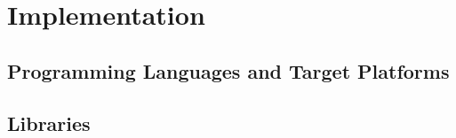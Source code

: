 \chapter{Implementation}
\label{cha:Implementation}

\section{Programming Languages and Target Platforms}
\section{Libraries}